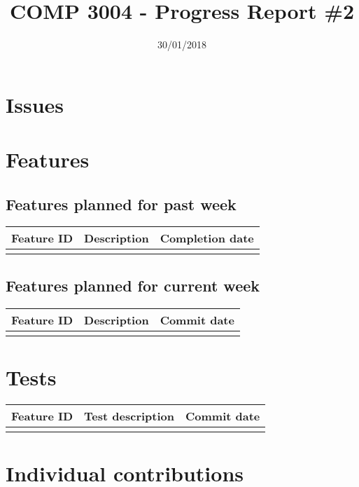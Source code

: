 \documentclass[10pt,a4paper]{article}
\title{COMP 3004 - Progress Report \#2}
\author{}
\date{30/01/2018}
\begin{document}
\maketitle


\section{Issues}

\section{Features}

\subsection{Features planned for past week}

\begin{center}
\begin{tabular}{l l l}
Feature ID & Description & Completion date\\
\hline\\
\end{tabular}
\end{center}


\subsection{Features planned for current week}

\begin{center}
\begin{tabular}{l l l}
Feature ID & Description & Commit date\\
\hline\\
\end{tabular}
\end{center}

\section{Tests}

\begin{center}
\begin{tabular}{l l l}
Feature ID & Test description & Commit date\\
\hline\\
\end{tabular}
\end{center}

\section{Individual contributions}
\end{document}
